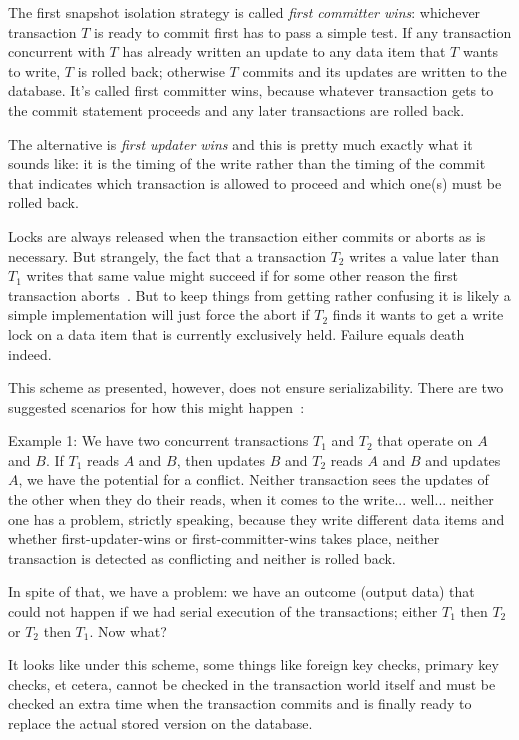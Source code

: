 \documentclass[a4paper]{report}
\begin{document}
The first snapshot isolation strategy is called \textit{first committer wins}: whichever transaction $T$ is ready to commit first has to pass a simple test. If any transaction concurrent with $T$ has already written an update to any data item that $T$ wants to write, $T$ is rolled back; otherwise $T$ commits and its updates are written to the database. It's called first committer wins, because whatever transaction gets to the commit statement proceeds and any later transactions are rolled back.

The alternative is \textit{first updater wins} and this is pretty much exactly what it sounds like: it is the timing of the write rather than the timing of the commit that indicates which transaction is allowed to proceed and which one(s) must be rolled back.  

Locks are always released when the transaction either commits or aborts as is necessary. But strangely, the fact that a transaction $T_{2}$ writes a value later than $T_{1}$ writes that same value might succeed if for some other reason the first transaction aborts~\cite{dsc}. But to keep things from getting rather confusing it is likely a simple implementation will just force the abort if $T_{2}$ finds it wants to get a write lock on a data item that is currently exclusively held. Failure equals death indeed.

This scheme as presented, however, does not ensure serializability. There are two suggested scenarios for how this might happen~\cite{dsc}:

Example 1: We have two concurrent transactions $T_{1}$ and $T_{2}$ that operate on $A$ and $B$. If $T_{1}$ reads $A$ and $B$, then updates $B$ and $T_{2}$ reads $A$ and $B$ and updates $A$, we have the potential for a conflict. Neither transaction sees the updates of the other when they do their reads, when it comes to the write... well... neither one has a problem, strictly speaking, because they write different data items and whether first-updater-wins or first-committer-wins takes place, neither transaction is detected as conflicting and neither is rolled back.

In spite of that, we have a problem: we have an outcome (output data) that could not happen if we had serial execution of the transactions; either $T_{1}$ then $T_{2}$ or $T_{2}$ then $T_{1}$. Now what? 

It looks like under this scheme, some things like foreign key checks, primary key checks, et cetera, cannot be checked in the transaction world itself and must be checked an extra time when the transaction commits and is finally ready to replace the actual stored version on the database.
\end{document}
